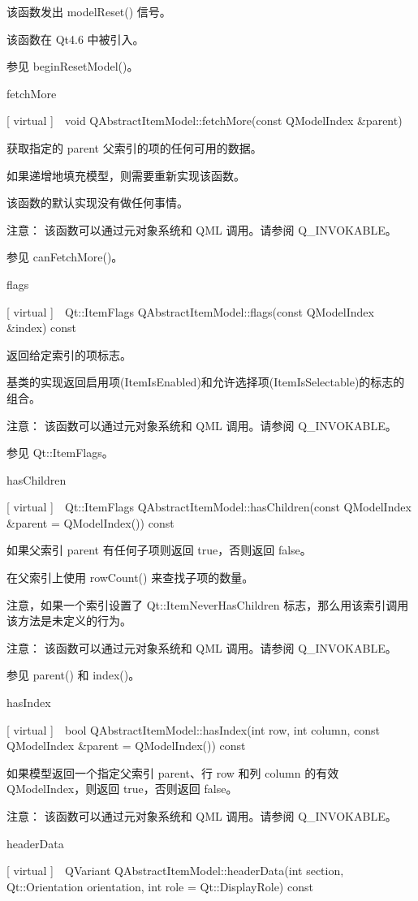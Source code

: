该函数发出 modelReset() 信号。

该函数在 Qt4.6 中被引入。

参见 beginResetModel()。

fetchMore

[ virtual ] void QAbstractItemModel::fetchMore(const QModelIndex \&parent)

获取指定的 parent 父索引的项的任何可用的数据。

如果递增地填充模型，则需要重新实现该函数。

该函数的默认实现没有做任何事情。

注意： 该函数可以通过元对象系统和 QML 调用。请参阅 Q\_INVOKABLE。

参见 canFetchMore()。

flags

[ virtual ] Qt::ItemFlags QAbstractItemModel::flags(const QModelIndex
\&index) const

返回给定索引的项标志。

基类的实现返回启用项(ItemIsEnabled)和允许选择项(ItemIsSelectable)的标志的组合。

注意： 该函数可以通过元对象系统和 QML 调用。请参阅 Q\_INVOKABLE。

参见 Qt::ItemFlags。

hasChildren

[ virtual ] Qt::ItemFlags QAbstractItemModel::hasChildren(const QModelIndex \&parent = QModelIndex()) const

如果父索引 parent 有任何子项则返回 true，否则返回 false。

在父索引上使用 rowCount() 来查找子项的数量。

注意，如果一个索引设置了 Qt::ItemNeverHasChildren 标志，那么用该索引调用该方法是未定义的行为。

注意： 该函数可以通过元对象系统和 QML 调用。请参阅 Q\_INVOKABLE。

参见 parent() 和 index()。


hasIndex

[ virtual ] bool QAbstractItemModel::hasIndex(int row, int column,
const QModelIndex 
\&parent = QModelIndex()) const

如果模型返回一个指定父索引 parent、行 row 和列 column 的有效 QModelIndex，则返回 true，否则返回 false。

注意： 该函数可以通过元对象系统和 QML 调用。请参阅 Q\_INVOKABLE。

headerData

[ virtual ] QVariant QAbstractItemModel::headerData(int section, Qt::Orientation orientation, int role = Qt::DisplayRole) const

